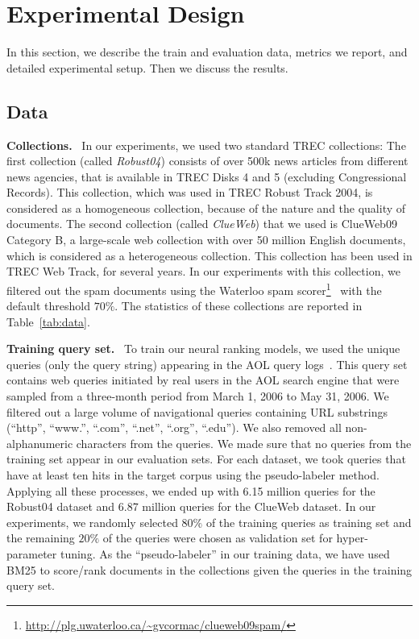 \documentclass[sigconf]{acmart}
\newcommand{\sshrink}{\vspace{-.80ex}}
\newcommand{\mypar}[1]{\vspace*{-0.1ex}\medskip\noindent\textbf{#1}~}
\begin{document}
\sshrink
\section{Experimental Design}
In this section, we describe the train and evaluation data, metrics we report, and detailed experimental setup. Then we discuss the results.


\sshrink
\subsection{Data}
\label{sec:data}
\mypar{Collections.}
In our experiments, we used two standard TREC collections: The first collection (called \emph{Robust04}) consists of over 500k news articles from different news agencies, that is available in TREC Disks 4 and 5 (excluding Congressional Records). This collection, which was used in TREC Robust Track 2004, is considered as a homogeneous collection, because of the nature and the quality of documents. The second collection (called \emph{ClueWeb}) that we used is ClueWeb09 Category B, a large-scale web collection with over 50 million English documents, which is considered as a heterogeneous collection. This collection has been used in TREC Web Track, for several years. In our experiments with this collection, we filtered out the spam documents using the Waterloo spam scorer\footnote{\url{http://plg.uwaterloo.ca/~gvcormac/clueweb09spam/}}~\citep{Cormack:2011} with the default threshold $70\%$. The statistics of these collections are reported in Table~\ref{tab:data}. 

\mypar{Training query set.}
To train our neural ranking models, we used the unique queries (only the query string) appearing in the AOL query logs~\citep{Pass:2006}. This query set contains web queries initiated by real users in the AOL search engine that were sampled from a three-month period from March 1, 2006 to May 31, 2006. We filtered out a large volume of navigational queries containing URL substrings (``http'', ``www.'', ``.com'', ``.net'', ``.org'', ``.edu''). We also removed all non-alphanumeric characters from the queries. We made sure that no queries from the training set appear in our evaluation sets. For each dataset, we took queries that have at least ten hits in the target corpus using the pseudo-labeler method. Applying all these processes, we ended up with 6.15 million queries for the Robust04 dataset and 6.87 million queries for the ClueWeb dataset. 
In our experiments, we randomly selected $80\%$ of the training queries as training set and the remaining $20\%$ of the queries were chosen as validation set for hyper-parameter tuning. As the ``pseudo-labeler'' in our training data, we have used BM25 to score/rank documents in the collections given the queries in the training query set.
\end{document}
